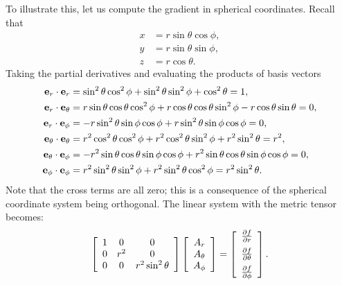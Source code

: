 To illustrate this, let us compute the gradient in spherical coordinates. Recall that
\begin{align}
  x &= r \sin \theta \cos \phi , \nonumber \\
  y &= r \sin \theta \sin \phi, \nonumber  \\
  z &= r \cos \theta . \nonumber 
\end{align}
Taking the partial derivatives and evaluating the products of basis vectors
\begin{subequations}
\begin{align}
  \mathbf{e}_r \cdot \mathbf{e}_r      &= \sin^2 \theta \cos^2 \phi + \sin^2 \theta \sin^2 \phi + \cos^2 \theta = 1, \\
  \mathbf{e}_r \cdot \mathbf{e}_\theta &= r \sin \theta \cos \theta \cos^2 \phi + r \cos \theta \cos \theta \sin^2 \phi - r \cos \theta \sin \theta  = 0, \\
  \mathbf{e}_r \cdot \mathbf{e}_\phi   &= - r \sin^2 \theta \sin \phi \cos \phi + r \sin^2 \theta \sin \phi \cos \phi = 0, \\
  \mathbf{e}_\theta \cdot \mathbf{e}_\theta &= r^2 \cos^2 \theta \cos^2 \phi + r^2 \cos^2 \theta \sin^2 \phi + r^2 \sin^2 \theta = r^2, \\
  \mathbf{e}_\theta \cdot \mathbf{e}_\phi   &= -r^2 \sin \theta \cos \theta \sin \phi \cos \phi + r^2 \sin \theta \cos \theta \sin \phi \cos \phi = 0, \\
  \mathbf{e}_\phi \cdot \mathbf{e}_\phi     &= r^2 \sin^2 \theta \sin^2 \phi + r^2 \sin^2 \theta \cos^2 \phi = r^2 \sin^2 \theta .
\end{align}
\end{subequations}
Note that the cross terms are all zero; this is a consequence of the spherical coordinate system being orthogonal. The linear system with the metric tensor becomes:
\begin{align}
  \left[ \begin{array}{c c c} 
  1 & 0   & 0 \\
  0 & r^2 & 0 \\
  0 & 0   & r^2 \sin^2 \theta \\ \end{array} \right]
  \left[ \begin{array}{c} A_r \\ A_\theta \\ A_\phi \\ \end{array} \right] = 
  \left[ \begin{array}{c} \dho{f}{r} \vspace{0.2cm} \\  \dho{f}{\theta} \vspace{0.2cm} \\ \dho{f}{\phi} \\ \end{array} \right] .
\end{align}
